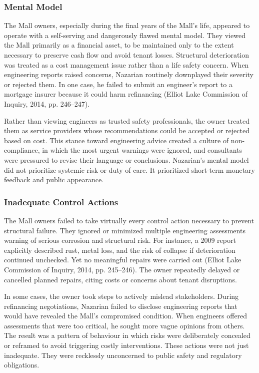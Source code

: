 \documentclass[12pt]{article}
\begin{document}
\subsubsection*{Mental Model}
The Mall owners, especially during the final years of the Mall’s life, appeared to operate with a self-serving and dangerously flawed mental model. They viewed the Mall primarily as a financial asset, to be maintained only to the extent necessary to preserve cash flow and avoid tenant losses. Structural deterioration was treated as a cost management issue rather than a life safety concern. When engineering reports raised concerns, Nazarian routinely downplayed their severity or rejected them. In one case, he failed to submit an engineer’s report to a mortgage insurer because it could harm refinancing (Elliot Lake Commission of Inquiry, 2014, pp. 246–247).

Rather than viewing engineers as trusted safety professionals, the owner treated them as service providers whose recommendations could be accepted or rejected based on cost. This stance toward engineering advice created a culture of non-compliance, in which the most urgent warnings were ignored, and consultants were pressured to revise their language or conclusions. Nazarian’s mental model did not prioritize systemic risk or duty of care. It prioritized short-term monetary feedback and public appearance.

\subsubsection*{Inadequate Control Actions}
The Mall owners failed to take virtually every control action necessary to prevent structural failure. They ignored or minimized multiple engineering assessments warning of serious corrosion and structural risk. For instance, a 2009 report explicitly described rust, metal loss, and the risk of collapse if deterioration continued unchecked. Yet no meaningful repairs were carried out (Elliot Lake Commission of Inquiry, 2014, pp. 245–246). The owner repeatedly delayed or cancelled planned repairs, citing costs or concerns about tenant disruptions.

In some cases, the owner took steps to actively mislead stakeholders. During refinancing negotiations, Nazarian failed to disclose engineering reports that would have revealed the Mall’s compromised condition. When engineers offered assessments that were too critical, he sought more vague opinions from others. The result was a pattern of behaviour in which risks were deliberately concealed or reframed to avoid triggering costly interventions. These actions were not just inadequate. They were recklessly unconcerned to public safety and regulatory obligations.
\end{document}
